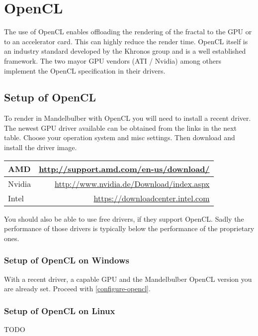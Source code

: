 

\section{OpenCL}\label{opencl}

The use of OpenCL enables offloading the rendering of the fractal to the
GPU or to an accelerator card. This can highly reduce the render time.
OpenCL itself is an industry standard developed by the Khronos group and
is a well established framework. The two mayor GPU vendors (ATI / Nvidia)
among others implement the OpenCL specification in their drivers.

\subsection{Setup of OpenCL}\label{setup-opencl}
To render in Mandelbulber with OpenCL you will need to install a recent driver.
The newest GPU driver available can be obtained from the links in the next table.
Choose your operation system and misc settings.
Then download and install the driver image.

\begin{center}
	\begin{tabular}{ | l | r | }
		\hline
		AMD 	&
		\href{http://support.amd.com/en-us/download/}{http://support.amd.com/en-us/download/}
		\\ \hline
		Nvidia 	& 
		\href{http://www.nvidia.de/Download/index.aspx}{http://www.nvidia.de/Download/index.aspx}
		\\ \hline
		Intel	&
		\href{https://downloadcenter.intel.com}{https://downloadcenter.intel.com}
		\\ \hline
	\end{tabular}
\end{center}

You should also be able to use free drivers, if they support OpenCL.
Sadly the performance of those drivers is typically below the performance of the proprietary ones.

\subsubsection{Setup of OpenCL on Windows}\label{setup-opencl-windows}
With a recent driver, a capable GPU and the Mandelbulber OpenCL version you are already set.
Proceed with \ref{configure-opencl}.

\subsubsection{Setup of OpenCL on Linux}\label{setup-opencl-linux}
TODO

